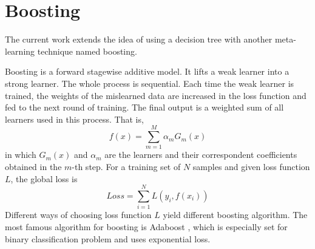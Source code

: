 \documentclass{edm_template}
\begin{document}


\section{Boosting}

The current work extends the idea of using a decision tree with another meta-learning technique named boosting.

Boosting\cite{schapire2012boosting} is a forward stagewise additive model\cite{murphy2012machine}. It lifts a weak learner into a strong learner. The whole process is sequential. Each time the weak learner is trained, the weights of the mislearned data are increased in the loss function and fed to the next round of training. The final output is a weighted sum of all learners used in this process. That is,
$$ f(x)=\sum\limits_{m=1}^M\alpha_mG_m(x)$$
in which $G_m(x)$ and $\alpha_m$  are the learners and their correspondent coefficients obtained in the $m$-th step. For a training set of $N$ samples and given loss function $L$, the global loss is
$$ Loss=\sum\limits_{i=1}^NL(y_i,f(x_i))$$
Different ways of choosing loss function $L$ yield different boosting algorithm. The most famous algorithm for boosting is Adaboost \cite{freund1997decision}, which is especially set for binary classification problem and uses exponential loss. 
\end{document}
